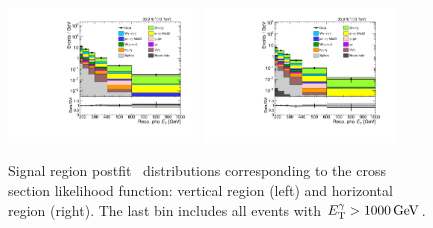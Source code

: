 \begin{figure}[htbp]
  \begin{center}
    \includegraphics[width=0.45\textwidth]{figures/xsec_results/Postfit/postfit_znng_SA_phoPt.pdf}
    \includegraphics[width=0.45\textwidth]{figures/xsec_results/Postfit/postfit_znng_SB_phoPt.pdf}
    \caption{
      Signal region postfit \ETgamma\ distributions corresponding to the cross section likelihood function:
      vertical region (left) and horizontal region (right).
      The last bin includes all events with $\ETgamma > 1000\unit{GeV}$.
    }
    \label{fig:postfitXS_SR}
  \end{center}
\end{figure}

